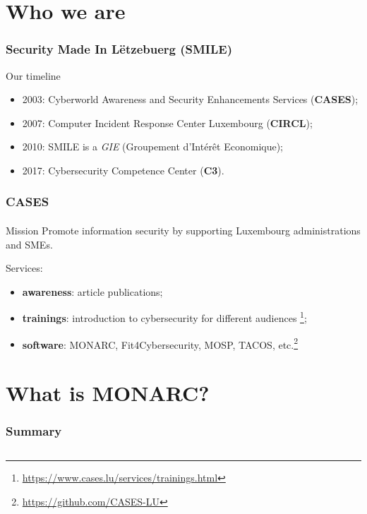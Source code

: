%
%
\section{Who we are}
\begin{frame}
    \frametitle{Security Made In Lëtzebuerg (SMILE)}
    Our timeline
    \begin{center}
        \begin{itemize}
            \item 2003: Cyberworld Awareness and Security Enhancements Services (\textbf{CASES});
            \item 2007: Computer Incident Response Center Luxembourg (\textbf{CIRCL});
            \item 2010: SMILE is a \textit{GIE} (Groupement d’Intérêt Economique);
            \item 2017: Cybersecurity Competence Center (\textbf{C3}).
        \end{itemize}
    \end{center}
\end{frame}

\begin{frame}
    \frametitle{CASES}
    \framesubtitle{}
    \begin{block}{Mission}
        Promote information security by supporting Luxembourg administrations and SMEs.
    \end{block}
    \bigskip
    Services:
    \begin{center}
        \begin{itemize}
            \item \textbf{awareness}: article publications;
            \item \textbf{trainings}:
                introduction to cybersecurity for different audiences \footnote{\url{https://www.cases.lu/services/trainings.html}};
            \item \textbf{software}:
                MONARC, Fit4Cybersecurity, MOSP, TACOS, etc.\footnote{\url{https://github.com/CASES-LU}}
        \end{itemize}
    \end{center}
\end{frame}




%
%
\section{What is MONARC?}
\begin{frame}
    \frametitle{Summary}
    \begin{columns}[t]
        \begin{column}{5cm}
            \tableofcontents[sections={1-3}, currentsection, hideothersubsections]
        \end{column}
        \begin{column}{5cm}
            \tableofcontents[sections={4-6}, currentsection, hideothersubsections]
        \end{column}
    \end{columns}
\end{frame}
